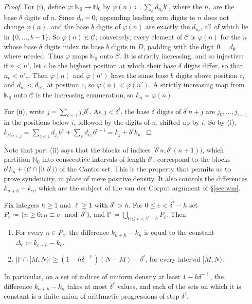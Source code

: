 \begin{proof}
For (i), define $\varphi \colon \mathbb N_0 \to \mathbb N_0$ by $\varphi(n) \coloneqq \sum_c d_{n_c} b ^{c}$, where the $n_c$ are the base $\delta$ digits of $n$.  
Since $d_0 = 0$, appending leading zero digits to $n$ does not change $\varphi(n)$, and the base $b$ digits of $\varphi (n)$ are exactly the $d_{n_c}$, all of which lie in $\{0 , \ldots, b-1\}$.  
So $\varphi(n) \in \mathcal C$; conversely, every element of $\mathcal C$ is $\varphi(n)$ for the $n$ whose base $\delta$ digits index its base $b$ digits in $D$, 
padding with the digit $0 = d_0$ where needed.  Thus $\varphi$ maps $\mathbb N_0$ onto $\mathcal C$.  It is strictly increasing, and so injective: if $n<n'$, let $c$ be the highest position at which their base $\delta$ digits differ, 
so that $n_c < n'_c$.  Then $\varphi(n)$ and $\varphi(n')$ have the same base $b$ digits above position $c$, and $d_{n_c} < d_{n'_c}$ at position $c$, so $\varphi(n)<\varphi(n')$.  
A strictly increasing map from $\mathbb N_0$ onto $\mathcal C$ is the increasing enumeration, so $k_n = \varphi(n)$.  

For (ii), write $j = \sum_{c<i} j_c \delta ^{c}$.  As $j< \delta ^{i}$, the base $\delta$ digits of $\delta ^{i}n + j$ are $j_0 , \ldots, j_{i-1}$ in the positions below $i$, 
followed by the digits of $n$, shifted up by $i$.  So by (i), $k_{\delta ^{i}n+j} = \sum_{c<i} d_{j_c}b ^{c} + \sum_c d_{n_c}b ^{c+i} = k_j + b ^{i}k_n$.  
\end{proof}


Note that part (ii) says that the blocks of indices 
$[\delta ^i n , \delta ^{i} (n+1))$, which partition $\mathbb N_0$ into consecutive intervals of length $\delta ^{i}$, 
correspond to the blocks $b ^{i} k_n + \bigl( \mathcal C \cap [0,b ^{i}) \bigr)$ of the Cantor set.  
This is the property that permits us to prove syndeticity, in place of mere positive density.  
It also controls the differences $k _{n+h}-k_n$, which are the subject of the van der Corput argument of \S\ref{sec:wm}.  

\begin{lemma} \label{l:differences}
Fix integers $h \geq 1$ and $\ell \geq 1$ with $\delta ^{\ell} > h$.  
For $0 \leq c < \delta ^{\ell}-h$ set $P_c \coloneqq \{ n \geq 0 \colon n \equiv c \mod \delta ^{\ell}\}$, 
and $\mathbb P \coloneqq \bigcup _{0\leq c < \delta ^{\ell}-h} P_c$. Then 
\begin{enumerate}
\item[(i)] For every $n \in P_c$, the difference $k _{n+h}-k_n$ is equal to the constant $\Delta _c \coloneqq k _{c+h}-k_c$.  
\item[(ii)] $\bigl\lvert \mathbb P \cap [M,N) \bigr\rvert \geq (1- h \delta ^{- \ell})(N-M) - \delta ^{\ell}$, for every interval $[M,N)$.  
\end{enumerate}
In particular, on a set of indices of uniform density at least $1-h \delta ^{-\ell}$, the difference $k_{n+h}-k_n$ takes at most $\delta ^{\ell}$ values, 
and each of the sets on which it is constant is a finite union of arithmetic progressions of step $\delta ^{\ell}$.  
\end{lemma}

